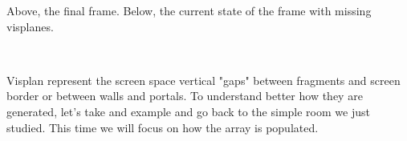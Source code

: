  \label{mashed_potatoes1.png}

Above, the final frame. Below, the current state of the frame with missing visplanes.

\vspace{4mm}




\vspace{-4mm}
\\
\par
Visplan represent the screen space vertical "gaps" between fragments and screen border or between walls and portals. To understand better how they are generated, let's take and example and go back to the simple room we just studied. This time we will focus on how the  array is populated.\\
\par

